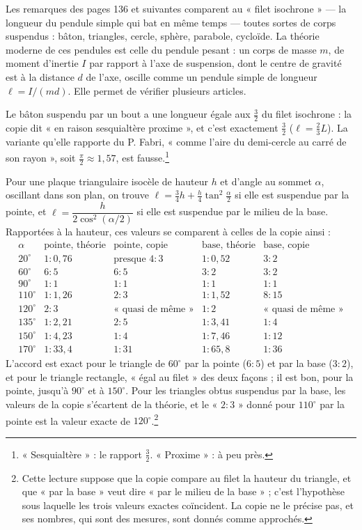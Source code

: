 \documentclass[11pt,a4paper]{article}
\begin{document}
Les remarques des pages 136 et suivantes comparent au « filet isochrone » — la
longueur du pendule simple qui bat en même temps — toutes sortes de corps
suspendus : bâton, triangles, cercle, sphère, parabole, cycloïde. La théorie
moderne de ces pendules est celle du pendule pesant : un corps de masse $m$,
de moment d'inertie $I$ par rapport à l'axe de suspension, dont le centre de
gravité est à la distance $d$ de l'axe, oscille comme un pendule simple de
longueur $\ell = I/(md)$. Elle permet de vérifier plusieurs articles.

Le bâton suspendu par un bout a une longueur égale aux $\frac32$ du filet
isochrone : la copie dit « en raison sesquialtère proxime », et c'est
exactement $\frac32$ ($\ell = \frac23 L$). La variante qu'elle rapporte du
P. Fabri, « comme l'aire du demi-cercle au carré de son rayon », soit
$\frac{\pi}{2} \approx 1{,}57$, est fausse.\footnote{« Sesquialtère » : le
rapport $\frac32$. « Proxime » : à peu près.}

Pour une plaque triangulaire isocèle de hauteur $h$ et d'angle au sommet
$\alpha$, oscillant dans son plan, on trouve $\ell = \frac34 h +
\frac{h}{4}\tan^2\frac{\alpha}{2}$ si elle est suspendue par la pointe, et
$\ell = \dfrac{h}{2\cos^2(\alpha/2)}$ si elle est suspendue par le milieu de
la base. Rapportées à la hauteur, ces valeurs se comparent à celles de la copie
ainsi :
\[
\begin{array}{r|cc|cc}
\alpha & \text{pointe, théorie} & \text{pointe, copie}
  & \text{base, théorie} & \text{base, copie} \\ \hline
20^\circ & 1 : 0{,}76 & \text{presque } 4:3 & 1 : 0{,}52 & 3 : 2 \\
60^\circ & 6 : 5 & 6 : 5 & 3 : 2 & 3 : 2 \\
90^\circ & 1 : 1 & 1 : 1 & 1 : 1 & 1 : 1 \\
110^\circ & 1 : 1{,}26 & 2 : 3 & 1 : 1{,}52 & 8 : 15 \\
120^\circ & 2 : 3 & \text{« quasi de même »} & 1 : 2 & \text{« quasi de même »} \\
135^\circ & 1 : 2{,}21 & 2 : 5 & 1 : 3{,}41 & 1 : 4 \\
150^\circ & 1 : 4{,}23 & 1 : 4 & 1 : 7{,}46 & 1 : 12 \\
170^\circ & 1 : 33{,}4 & 1 : 31 & 1 : 65{,}8 & 1 : 36
\end{array}
\]
L'accord est exact pour le triangle de $60^\circ$ par la pointe ($6 : 5$) et par
la base ($3 : 2$), et pour le triangle rectangle, « égal au filet » des deux
façons ; il est bon, pour la pointe, jusqu'à $90^\circ$ et à $150^\circ$. Pour
les triangles obtus suspendus par la base, les valeurs de la copie s'écartent
de la théorie, et le « $2 : 3$ » donné pour $110^\circ$ par la pointe est la
valeur exacte de $120^\circ$.\footnote{Cette lecture suppose que la copie
compare au filet la hauteur du triangle, et que « par la base » veut dire
« par le milieu de la base » ; c'est l'hypothèse sous laquelle les trois
valeurs exactes coïncident. La copie ne le précise pas, et ses nombres, qui
sont des mesures, sont donnés comme approchés.}
\end{document}
